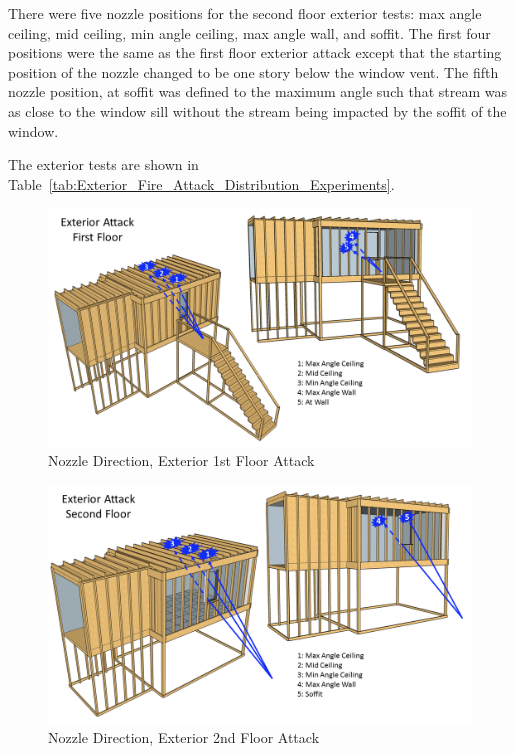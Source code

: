 \documentclass{article}
\begin{document}
There were five nozzle positions for the second floor exterior tests: max angle ceiling, mid ceiling, min angle ceiling, max angle wall, and soffit. The first four positions were the same as the first floor exterior attack except that the starting position of the nozzle changed to be one story below the window vent. The fifth nozzle position, at soffit was defined to the  maximum angle such that stream was as close to the window sill without the stream being impacted by the soffit of the window.

The exterior tests are shown in Table~\ref{tab:Exterior_Fire_Attack_Distribution_Experiments}.

\begin{figure}[!ht]
	\centering
	\includegraphics[width=\columnwidth]{Figures/Water_Distribution/Nozzle_Position_ExtFirstfloor}
	\caption{Nozzle Direction, Exterior 1st Floor Attack}
	\label{fig:Nozzle_Direction_Exterior_1st_Floor_Attack}
\end{figure}

\begin{figure}[!ht]
	\centering
	\includegraphics[width=\columnwidth]{Figures/Water_Distribution/Nozzle_Position_ExtSecondfloor}
	\caption{Nozzle Direction, Exterior 2nd Floor Attack}
	\label{fig:Nozzle_Direction_Exterior_2nd_Floor_Attack}
\end{figure}
\end{document}
